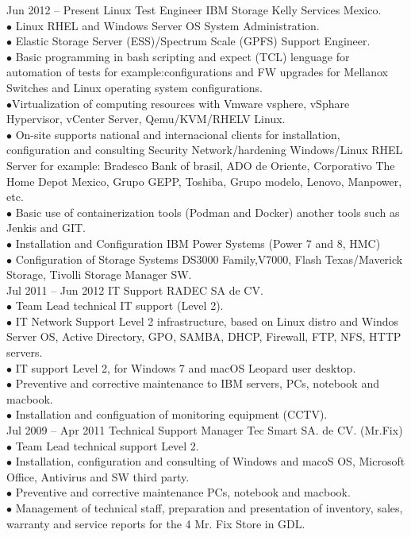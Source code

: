 \documentclass[9pt]{developercv} %
\begin{document}

\begin{entrylist}
	\entry
		{Jun 2012 -- Present}
		{Linux Test Engineer IBM Storage}
		{Kelly Services Mexico.}
			{{}\\$\bullet$ Linux RHEL and Windows Server OS System Administration.
				\\$\bullet$ Elastic Storage Server (ESS)/Spectrum Scale (GPFS) Support Engineer.
					\\$\bullet$ Basic programming in bash scripting and expect (TCL) lenguage for automation of tests for example:configurations and FW upgrades for Mellanox Switches and Linux operating system configurations.						
				\\$\bullet$Virtualization of computing resources with Vmware vsphere, vSphare Hypervisor, vCenter Server, Qemu/KVM/RHELV Linux.
				\\$\bullet$ On-site supports national and internacional clients for installation, configuration and consulting Security Network/hardening Windows/Linux RHEL Server for example:
				Bradesco Bank of brasil, ADO de Oriente, Corporativo The Home Depot Mexico, Grupo GEPP, Toshiba, Grupo modelo, Lenovo, Manpower,
				etc.
				\\$\bullet$ Basic use of containerization tools (Podman and Docker) another tools such as Jenkis and GIT. 			
				\\$\bullet$ Installation and Configuration IBM Power Systems (Power 7 and 8, HMC)\\$\bullet$ Configuration of Storage Systems DS3000 Family,V7000, Flash Texas/Maverick Storage, Tivolli Storage Manager SW.\\}
	\entry
	{Jul 2011 -- Jun 2012}
	{IT Support}
	{RADEC SA de CV.}
	{{} \\$\bullet$ Team Lead technical IT support (Level 2). 
		\\$\bullet$ IT Network Support Level 2 infrastructure, based
		on Linux distro and Windos Server OS, Active Directory, GPO, SAMBA, DHCP, Firewall, FTP,
		NFS, HTTP servers.
		\\$\bullet$ IT support Level 2, for Windows 7 and macOS Leopard user desktop.
		\\$\bullet$ Preventive and corrective maintenance to IBM servers, PCs, notebook and macbook.\\$\bullet$ Installation and configuation of monitoring equipment (CCTV).\\}
	\entry
	{Jul 2009 -- Apr 2011}
		{Technical Support Manager}
	{Tec Smart SA. de CV. (Mr.Fix)}
	{{}\\$\bullet$ Team Lead technical support Level 2.
		\\$\bullet$ Installation, configuration and consulting of Windows and macoS OS, Microsoft Office, Antivirus and SW third party.
		\\$\bullet$ Preventive and corrective maintenance PCs, notebook and macbook.
		\\$\bullet$ Management of technical staff, preparation and presentation of inventory, sales, warranty and service reports for the 4 Mr. Fix Store in GDL. \\ \\}
\end{entrylist}
\end{document}
